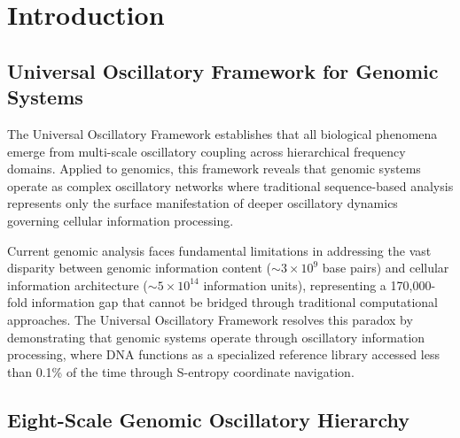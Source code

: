\documentclass[12pt,a4paper]{article}
\begin{document}
\section{Introduction}

\subsection{Universal Oscillatory Framework for Genomic Systems}

The Universal Oscillatory Framework establishes that all biological phenomena emerge from multi-scale oscillatory coupling across hierarchical frequency domains. Applied to genomics, this framework reveals that genomic systems operate as complex oscillatory networks where traditional sequence-based analysis represents only the surface manifestation of deeper oscillatory dynamics governing cellular information processing.

Current genomic analysis faces fundamental limitations in addressing the vast disparity between genomic information content ($\sim 3 \times 10^9$ base pairs) and cellular information architecture ($\sim 5 \times 10^{14}$ information units), representing a 170,000-fold information gap that cannot be bridged through traditional computational approaches. The Universal Oscillatory Framework resolves this paradox by demonstrating that genomic systems operate through oscillatory information processing, where DNA functions as a specialized reference library accessed less than 0.1\% of the time through S-entropy coordinate navigation.

\subsection{Eight-Scale Genomic Oscillatory Hierarchy}
\end{document}
